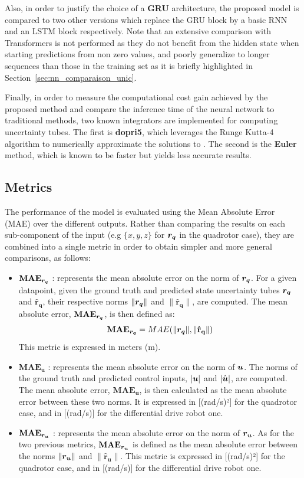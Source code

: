 Also, in order to justify the choice of a \textbf{GRU} architecture, the proposed model is compared to two other versions which replace the GRU block by a basic RNN \cite{cRNN} and an LSTM \cite{cLSTM} block respectively.
Note that an extensive comparison with Transformers \cite{cTrans} is not performed as they do not benefit from the hidden state when starting predictions from non zero values, and poorly generalize to longer sequences than those in the training set as it is briefly highlighted in Section~\ref{sec:nn_comparaison_unic}.

Finally, in order to measure the computational cost gain achieved by the proposed method and compare the inference time of the neural network to traditional methods, two known  integrators are implemented for computing uncertainty tubes.
The first is \textbf{dopri5}, which leverages the Runge Kutta-4 algorithm to numerically approximate the solutions to . 
The second is the \textbf{Euler} method, which is known to be faster but yields less accurate results.

\subsection{Metrics}\label{sec:metric}

The performance of the model is evaluated using the Mean Absolute Error (MAE) over the different outputs. 
Rather than comparing the results on each sub-component of the input (e.g $\{x, y, z\}$ for $\boldsymbol{r_q}$ in the quadrotor case), they are combined into a single metric in order to obtain simpler and more general comparisons, as follows:
\begin{itemize}
    \item $\mathbf{MAE_{\boldsymbol{r_q}}}$ : represents the mean absolute error on the norm of $\boldsymbol{r_q}$. 
    For a given datapoint, given the ground truth and predicted state uncertainty tubes $\boldsymbol{r_q}$ and $\mathbf{\hat{r}_q}$, their respective norms $\|\boldsymbol{r_q}\|$ and $\|\mathbf{\hat{r}_q}\|$, are computed. 
    The mean absolute error, $\mathbf{MAE_{\boldsymbol{r_q}}}$, is then defined as:
    \begin{equation}\label{eq:MAE rq}
        \mathbf{MAE_{\boldsymbol{r_q}}} = MAE(\|\boldsymbol{r_q}\|, \|\mathbf{\hat{r}_q}\|)
    \end{equation}
    This metric is expressed in meters (m).
    \item $\mathbf{MAE_{u}}$ : represents the mean absolute error on the norm of $\boldsymbol{u}$. 
    The norms of the ground truth and predicted control inputs, $|\boldsymbol{u}|$ and $|\hat{\boldsymbol{u}}|$, are computed. 
    The mean absolute error, $\mathbf{MAE_{u}}$, is then calculated as the mean absolute error between these two norms. 
    It is expressed in [(rad/s)²] for the quadrotor case, and in [(rad/s)] for the differential drive robot one.
    \item $\mathbf{MAE_{\boldsymbol{r_u}}}$ : represents the mean absolute error on the norm of $\boldsymbol{r_u}$. 
    As for the two previous metrics, $\mathbf{MAE_{\boldsymbol{r_u}}}$ is defined as the mean absolute error between the norms $\|\boldsymbol{r_u}\|$ and $\|\mathbf{\hat{r}_u}\|$. 
    This metric is expressed in [(rad/s)²] for the quadrotor case, and in [(rad/s)] for the differential drive robot one.
\end{itemize}

